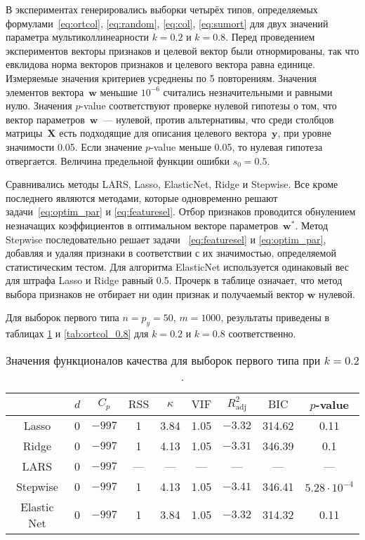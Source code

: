 \documentclass[a4paper,12pt]{article}
\newcommand{\bw}{\mathbf{w}}
\newcommand{\by}{\mathbf{y}}
\newcommand{\bX}{\mathbf{X}}
\newcommand{\vif}{\mathrm{VIF}}
\newcommand{\rss}{\mathrm{RSS}}
\newcommand{\bic}{\mathrm{BIC}}
\newcommand{\radj}{R_{\text{adj}}^2}
\theoremstyle{plain}
\begin{document}
В экспериментах генерировались выборки четырёх типов, определяемых формулами~\ref{eq:ortcol}, \ref{eq:random}, \ref{eq:col}, \ref{eq:sumort} для двух значений параметра мультиколлинеарности $k = 0.2$ и $k = 0.8$. Перед проведением экспериментов векторы признаков и целевой вектор были отнормированы, так что евклидова норма векторов признаков и целевого вектора равна единице. Измеряемые значения критериев усреднены по 5 повторениям. Значения элементов вектора~$\bw$ меньшие $10^{-6}$ считались незначительными и равными нулю. Значения $p$-value соответствуют проверке нулевой гипотезы о том, что вектор параметров~$\bw$~--- нулевой, против альтернативы, что среди столбцов матрицы~$\bX$ есть подходящие для описания целевого вектора~$\by$, при уровне значимости 0.05. Если значение $p$-value меньше 0.05, то нулевая гипотеза отвергается. Величина предельной функции ошибки $s_0 = 0.5$. 

Сравнивались методы  LARS, Lasso, ElasticNet, Ridge и Stepwise. Все кроме последнего являются методами, которые одновременно решают задачи~\eqref{eq:optim_par} и \eqref{eq:featuresel}. Отбор признаков проводится обнулением незначащих коэффициентов в оптимальном векторе параметров~$\bw^*$. Метод Stepwise последовательно решает задачи~ \eqref{eq:featuresel} и \eqref{eq:optim_par}, добавляя и удаляя признаки в соответствии с их значимостью, определяемой статистическим тестом. Для алгоритма ElasticNet используется одинаковый вес для штрафа Lasso и Ridge равный 0.5. Прочерк в таблице означает, что метод выбора признаков не отбирает ни один признак и получаемый вектор $\bw$ нулевой.

Для выборок первого типа $n = p_y = 50$, $m = 1000$, результаты приведены в таблицах \ref{tab:ortcol_0.2} и \ref{tab:ortcol_0.8} для $k = 0.2$ и $k = 0.8$ соответственно.
\begin{table}[h]
\centering
\caption{Значения функционалов качества для выборок первого типа при $k = 0.2$.}
\begin{tabular}{|c|c|c|c|c|c|c|c|c|}
\hline 
 & $d$ & $C_p$ & $\rss$ & $\kappa$ & $\vif$ & $\radj$ & $\bic$ & $p$-value \\ 
\hline 
Lasso & 0  &	$-997$ & 1 & 3.84 & 1.05 & $-3.32$ & 314.62 & 0.11 \\ 
\hline 
Ridge & 0 & $-997$ & 1 & 4.13 & 1.05 & $-3.31$ & 346.39 & 0.1 \\ 
\hline 
LARS & 0 & $-997$ & --- & --- & --- & --- & --- & --- \\ 
\hline 
Stepwise & 0 & $-997$ & 1 & 4.13 & 1.05 & $-3.41$ & 346.41 & $5.28 \cdot 10^{-4}$ \\
\hline
Elastic Net & 0 & $-997$ & 1 & 3.84 & 1.05 & $-3.32$ & 314.32 & 0.11 \\    
\hline 
\end{tabular}
\label{tab:ortcol_0.2}
\end{table}
\end{document}
